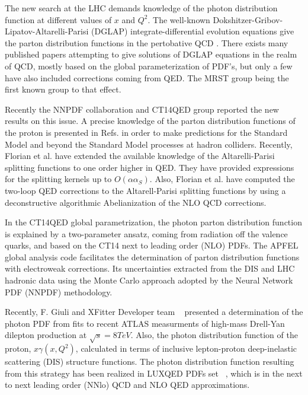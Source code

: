 \documentclass[review]{elsarticle}
\begin{document}
The new search at the LHC demands knowledge of the photon distribution
function at different values of $x$ and $Q^{2}$. The well-known Dokshitzer-Gribov-Lipatov-Altarelli-Parisi (DGLAP) integrate-differential evolution equations give the parton distribution
functions in the pertobative QCD \cite{Altarelli:1977zs,Dokshitzer:1977sg,Gribov:1972ri,Lipatov:1974qm}.
There exists many published papers attempting to give solutions of DGLAP equations in the realm of QCD, mostly based on the global parameterization of PDF's, but only a few have also included corrections  coming from QED.  The MRST group \cite{Martin:1998sq,Martin:2004dh} being the first known group to that effect.

Recently the NNPDF collaboration \cite{Bertone:2013vaa,Ball:2013hta}
and CT14QED group \cite{Schmidt:2015zda} reported the new
results on this issue. A precise knowledge of the parton distribution functions of the proton
is presented in Refs. \cite{Placakyte:2011az,Abramowicz:1900rp}
in order to make predictions for the Standard Model and beyond the Standard Model processes at hadron colliders. Recently, Florian et al. \cite{deFlorian:2015ujt}
have extended the available knowledge of the Altarelli-Parisi splitting
functions to one order higher in QED. They have provided expressions
for the splitting kernels up to $O(\alpha\alpha_{S})$. Also, Florian et al. \cite{deFlorian:2016gvk} have computed the two-loop QED corrections to the Altarell-Parisi splitting functions by using a deconstructive algorithmic Abelianization of the NLO QCD corrections.

In the CT14QED global parametrization, the photon parton distribution
function is explained by a two-parameter ansatz, coming from radiation
off the valence quarks, and based on the CT14 next to leading order
(NLO) PDFs. The APFEL global analysis code facilitates the determination of parton distribution
functions with electroweak corrections. Its uncertainties extracted
from the DIS and LHC hadronic data using the Monte Carlo approach adopted
by the Neural Network PDF (NNPDF) methodology.

Recently, F. Giuli and XFitter Developer team ~\cite{Giuli:2017oii} presented a determination of the photon PDF from fits to recent ATLAS measurments of high-mass Drell-Yan dilepton production at $\sqrt{s}=8 TeV$.
Also, the photon distribution function of the proton, $ x \gamma(x, Q^2)$, calculated in terms of inclusive lepton-proton deep-inelastic scattering (DIS) structure functions. The photon distribution function resulting from this strategy has been realized in LUXQED PDFs set ~\cite{Manohar:2016nzj}, which is in the next to next leading order (NNlo) QCD and NLO QED approximations.
\end{document}
